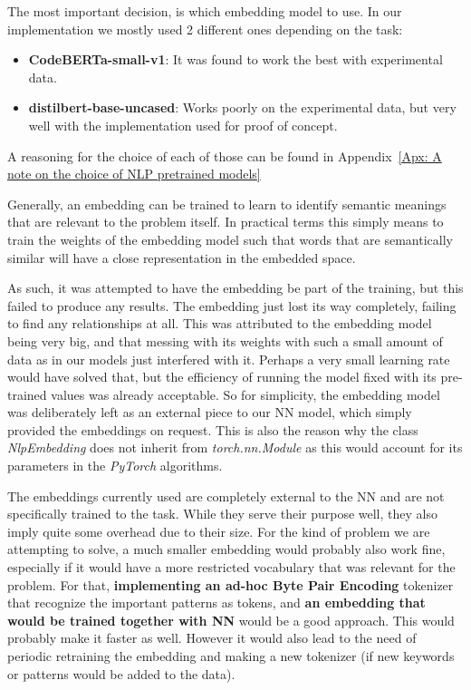 \documentclass[a4paper, 11pt]{report}
\begin{document}
    The most important decision, is which embedding model to use. In our implementation we mostly used 2 different ones depending on the task:
    \begin{itemize}
        \item \textbf{CodeBERTa-small-v1}: It was found to work the best with experimental data.
        \item \textbf{distilbert-base-uncased}: Works poorly on the experimental data, but very well with the implementation used for proof of concept.
    \end{itemize}

    A reasoning for the choice of each of those can be found in Appendix~\ref{Apx: A note on the choice of NLP pretrained models}

    \begin{tcolorbox}[title=Failed Approach have the embedding as part of the NN model, colback=white, colframe=red!60!black]
    Generally, an embedding can be trained to learn to identify semantic meanings that are relevant to the problem itself. In practical terms this simply means to train the weights of the embedding model such that words that are semantically similar will have a close representation in the embedded space.

    As such, it was attempted to have the embedding be part of the training, but this failed to produce any results. The embedding just lost its way completely, failing to find any relationships at all. This was attributed to the embedding model being very big, and that messing with its weights with such a small amount of data as in our models just interfered with it. Perhaps a very small learning rate would have solved that, but the efficiency of running the model fixed with its pre-trained values was already acceptable. So for simplicity, the embedding model was deliberately left as an external piece to our NN model, which simply provided the embeddings on request. This is also the reason why the class \textit{NlpEmbedding} does not inherit from \textit{torch.nn.Module} as this would account for its parameters in the \textit{PyTorch} algorithms.
    \end{tcolorbox}

    \begin{tcolorbox}[title=Future Development: Use a locally trained embedding, colback=white,colframe=green!40!black]
        The embeddings currently used are completely external to the NN and are not specifically trained to the task. While they serve their purpose well, they also imply quite some overhead due to their size. For the kind of problem we are attempting to solve, a much smaller embedding would probably also work fine, especially if it would have a more restricted vocabulary that was relevant for the problem. For that, \textbf{implementing an ad-hoc Byte Pair Encoding} tokenizer that recognize the important patterns as tokens, and \textbf{an embedding that would be trained together with NN} would be a good approach. This would probably make it faster as well. However it would also lead to the need of periodic retraining the embedding and making a new tokenizer (if new keywords or patterns would be added to the data).
    \end{tcolorbox}
\end{document}
